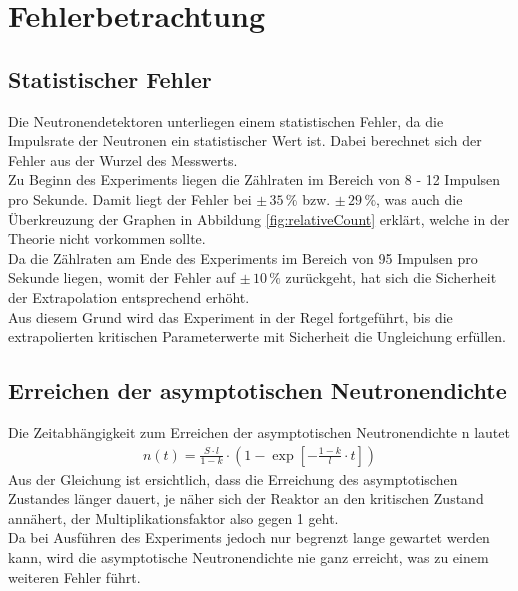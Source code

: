 \documentclass[12pt,german]{article}
\begin{document}
    \section{Fehlerbetrachtung}

    \subsection{Statistischer Fehler}
    Die Neutronendetektoren unterliegen einem statistischen Fehler, da die Impulsrate der Neutronen ein statistischer Wert ist.
    Dabei berechnet sich der Fehler aus der Wurzel des Messwerts. \\
    Zu Beginn des Experiments liegen die Zählraten im Bereich von 8 - 12 Impulsen pro Sekunde. Damit liegt der Fehler bei $\pm\, 35\, \%$ bzw. $\pm\, 29\, \%$, was auch die Überkreuzung der Graphen in Abbildung \ref{fig:relativeCount} erklärt, welche in der Theorie nicht vorkommen sollte. \\
    Da die Zählraten am Ende des Experiments im Bereich von 95 Impulsen pro Sekunde liegen, womit der Fehler auf $\pm\, 10\, \%$ zurückgeht, hat sich die Sicherheit der Extrapolation entsprechend erhöht. \\
    Aus diesem Grund wird das Experiment in der Regel fortgeführt, bis die extrapolierten kritischen Parameterwerte mit Sicherheit die Ungleichung erfüllen.
    
    \subsection{Erreichen der asymptotischen Neutronendichte}
    Die Zeitabhängigkeit zum Erreichen der asymptotischen Neutronendichte n lautet
    \begin{align*}
        n(t) = \frac{S \cdot l}{1 - k} \cdot \left(1 - \exp \left[- \frac{1 - k}{l} \cdot t\right] \right)
    \end{align*}
    Aus der Gleichung ist ersichtlich, dass die Erreichung des asymptotischen Zustandes länger dauert, je näher sich der Reaktor an den kritischen Zustand annähert, der Multiplikationsfaktor also gegen 1 geht. \\
    Da bei Ausführen des Experiments jedoch nur begrenzt lange gewartet werden kann, wird die asymptotische Neutronendichte nie ganz erreicht, was zu einem weiteren Fehler führt.

    \newpage
\end{document}
